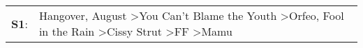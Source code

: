 \begin{supertabular}{p{0.03\textwidth}p{0.92\textwidth}}
 \textbf{S1}:  &  Hangover\textsuperscript{}, \enspace August\textsuperscript{} \textgreater \enspace You Can't Blame the Youth\textsuperscript{} \textgreater \enspace Orfeo\textsuperscript{}, \enspace Fool in the Rain\textsuperscript{} \textgreater \enspace Cissy Strut\textsuperscript{} \textgreater \enspace FF\textsuperscript{} \textgreater \enspace Mamu\textsuperscript{}  \enspace  \\
\end{supertabular}
